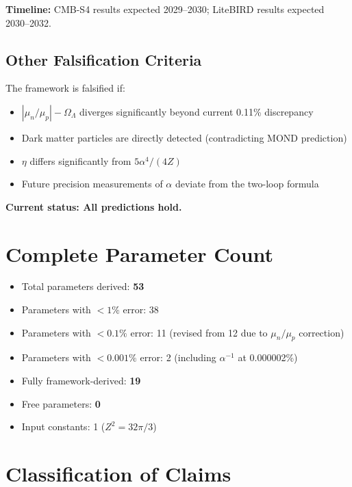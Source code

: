 \documentclass[11pt,a4paper]{article}
\theoremstyle{plain}
\theoremstyle{definition}
\theoremstyle{remark}
\newcommand{\OmegaL}{\Omega_\Lambda}
\begin{document}
\textbf{Timeline:} CMB-S4 results expected 2029--2030; LiteBIRD results expected 2030--2032.

\subsection{Other Falsification Criteria}

The framework is falsified if:
\begin{itemize}
  \item $|\mu_n/\mu_p| - \OmegaL$ diverges significantly beyond current 0.11\% discrepancy
  \item Dark matter particles are directly detected (contradicting MOND prediction)
  \item $\eta$ differs significantly from $5\alpha^4/(4Z)$
  \item Future precision measurements of $\alpha$ deviate from the two-loop formula
\end{itemize}

\textbf{Current status: All predictions hold.}

\section{Complete Parameter Count}

\begin{itemize}
  \item Total parameters derived: \textbf{53}
  \item Parameters with $<1\%$ error: 38
  \item Parameters with $<0.1\%$ error: 11 (revised from 12 due to $\mu_n/\mu_p$ correction)
  \item Parameters with $<0.001\%$ error: 2 (including $\alpha^{-1}$ at 0.000002\%)
  \item Fully framework-derived: \textbf{19}
  \item Free parameters: \textbf{0}
  \item Input constants: 1 ($Z^2 = 32\pi/3$)
\end{itemize}

\section{Classification of Claims}
\end{document}
